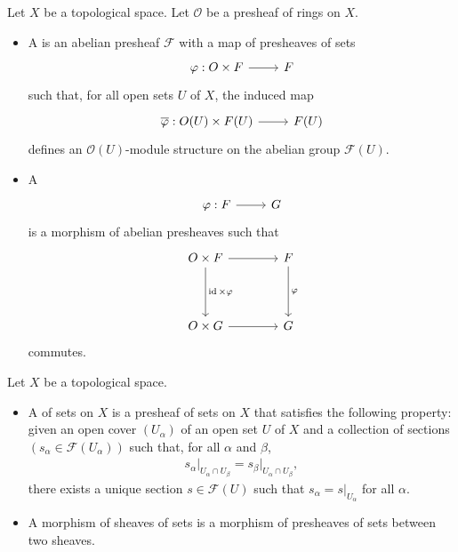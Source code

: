 \documentclass [11 pt, oneside] {article}
\begin{document}
\begin{definition}\label{}\text{}
Let $X$ be a topological space. Let $\mathscr{O}$ be a presheaf of rings on $X$.
\begin{itemize}
	\item A  is an abelian presheaf $\mathscr{F}$ with a map of presheaves of sets
		\[
		\begin{tikzcd}
			\varphi : \mathscr{O}\times \mathscr{F}\ar[r] & \mathscr{F}
		\end{tikzcd}
		\]
		such that, for all open sets $U$ of $X$, the induced map
		\[
		\begin{tikzcd}
			\overline{\varphi} : \mathscr{O}(U)\times  \mathscr{F}(U)\ar[r]&  \mathscr{F}(U)
		\end{tikzcd}
		\]
		defines an $\mathscr{O}(U)$-module structure on the abelian group $\mathscr{F}(U)$.

	\item A  
		\[
		\begin{tikzcd}
			\varphi :\mathscr{F}\ar[r]& \mathscr{G}
		\end{tikzcd}
		\]
		is a morphism of abelian presheaves such that 
		\[
		\begin{tikzcd}[sep = 4 em]
			\mathscr{O}\times \mathscr{F}\ar[r]\ar[d,"\id\times \varphi"] &\mathscr{F}\ar[d,"\varphi"]\\
			\mathscr{O}\times \mathscr{G}\ar[r] & \mathscr{G}
		\end{tikzcd}
		\]
		commutes.

\end{itemize}
\end{definition}

\begin{definition}\label{}\text{}
Let $X$ be a topological space.
\begin{itemize}
	\item A  of sets on $X$ is a presheaf of sets on $X$ that satisfies the following property: given an open cover $(U_{\alpha})$ of an open set $U$ of $X$ and a collection of sections $(s_{\alpha}\in \mathscr{F}(U_{\alpha})) $ such that, for all $\alpha$ and $\beta$,
		\begin{align*}
			s_{\alpha}\big|_{U_{\alpha}\cap U_{\beta}} = s_{\beta}\big|_{U_{\alpha}\cap U_{\beta}},
		\end{align*}
		there exists a unique section $s\in \mathscr{F}(U)$ such that $s_{\alpha} = s\big|_{U_{\alpha}}$ for all $\alpha$.
	\item A morphism of sheaves of sets is a morphism of presheaves of sets between two sheaves.
\end{itemize}
\end{definition}
\end{document}
